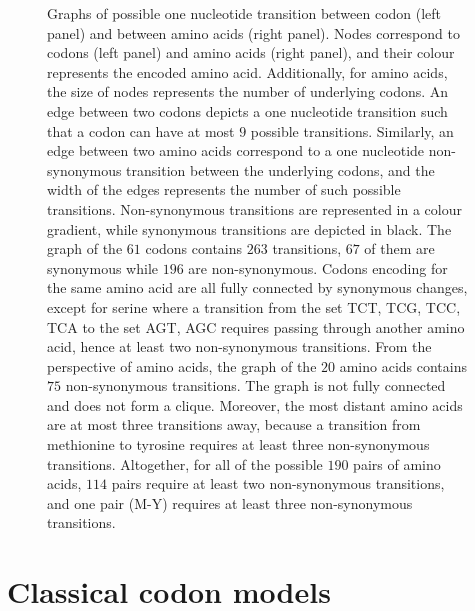 \begin{figure}[htbp]
    \caption[Graphs of {codon} and amino-acid transitions]{
    Graphs of possible one nucleotide transition between codon (left panel) and between amino acids (right panel).
    Nodes correspond to codons (left panel) and amino acids (right panel), and their colour represents the encoded amino acid.
    Additionally, for amino acids, the size of nodes represents the number of underlying codons.
    An edge between two codons depicts a one nucleotide transition such that a codon can have at most $9$ possible transitions.
    Similarly, an edge between two amino acids correspond to a one nucleotide non-synonymous transition between the underlying codons, and the width of the edges represents the number of such possible transitions.
    Non-synonymous transitions are represented in a colour gradient, while synonymous transitions are depicted in black.
    The graph of the $61$ codons contains $263$ transitions, $67$ of them are synonymous while $196$ are non-synonymous.
    Codons encoding for the same amino acid are all fully connected by synonymous changes, except for serine where a transition from the set {TCT, TCG, TCC, TCA} to the set {AGT, AGC} requires passing through another amino acid, hence at least two non-synonymous transitions.
    From the perspective of amino acids, the graph of the $20$ amino acids contains $75$ non-synonymous transitions.
    The graph is not fully connected and does not form a clique. Moreover, the most distant amino acids are at most three transitions away, because a transition from methionine to tyrosine requires at least three non-synonymous transitions.
    Altogether, for all of the possible $190$ pairs of amino acids, $114$ pairs require at least two non-synonymous transitions, and one pair (M-Y) requires at least three non-synonymous transitions.
    }
    \label{fig:graph-codons-aa}
\end{figure}


\section{Classical codon models}
\label{sec:intro-classical-codon-models}

